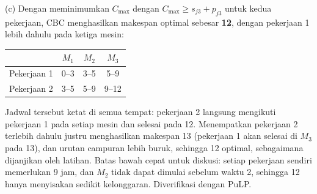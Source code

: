 (c) Dengan meminimumkan $C_{\max}$ dengan $C_{\max} \geq s_{j3} + p_{j3}$ untuk kedua pekerjaan, CBC menghasilkan makespan optimal sebesar \textbf{12}, dengan pekerjaan 1 lebih dahulu pada ketiga mesin:
\begin{center}
\begin{tabular}{l|ccc}
 & $M_1$ & $M_2$ & $M_3$\\
\hline
Pekerjaan 1 & 0--3 & 3--5 & 5--9\\
Pekerjaan 2 & 3--5 & 5--9 & 9--12\\
\end{tabular}
\end{center}
Jadwal tersebut ketat di semua tempat: pekerjaan 2 langsung mengikuti pekerjaan 1 pada setiap mesin dan selesai pada 12. Menempatkan pekerjaan 2 terlebih dahulu justru menghasilkan makespan 13 (pekerjaan 1 akan selesai di $M_3$ pada 13), dan urutan campuran lebih buruk, sehingga 12 optimal, sebagaimana dijanjikan oleh latihan. Batas bawah cepat untuk diskusi: setiap pekerjaan sendiri memerlukan 9 jam, dan $M_2$ tidak dapat dimulai sebelum waktu 2, sehingga 12 hanya menyisakan sedikit kelonggaran. Diverifikasi dengan PuLP.
